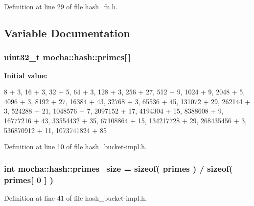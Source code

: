 Definition at line 29 of file hash\_\-fn.h.



\subsection{Variable Documentation}
\hypertarget{namespacemocha_1_1hash_a98b9570ac5f7d3eb6f5f82f9448048d4}{
\subsubsection[{primes}]{\setlength{\rightskip}{0pt plus 5cm}uint32\_\-t {\bf mocha::hash::primes}\mbox{[}$\,$\mbox{]}}}
\label{namespacemocha_1_1hash_a98b9570ac5f7d3eb6f5f82f9448048d4}
{\bfseries Initial value:}
\begin{DoxyCode}
 {
  8 + 3,
  16 + 3,
  32 + 5,
  64 + 3,
  128 + 3,
  256 + 27,
  512 + 9,
  1024 + 9,
  2048 + 5,
  4096 + 3,
  8192 + 27,
  16384 + 43,
  32768 + 3,
  65536 + 45,
  131072 + 29,
  262144 + 3,
  524288 + 21,
  1048576 + 7,
  2097152 + 17,
  4194304 + 15,
  8388608 + 9,
  16777216 + 43,
  33554432 + 35,
  67108864 + 15,
  134217728 + 29,
  268435456 + 3,
  536870912 + 11,
  1073741824 + 85
}
\end{DoxyCode}


Definition at line 10 of file hash\_\-bucket-\/impl.h.

\hypertarget{namespacemocha_1_1hash_a0dac030627349b25de202009e31652e6}{
\subsubsection[{primes\_\-size}]{\setlength{\rightskip}{0pt plus 5cm}int {\bf mocha::hash::primes\_\-size} = sizeof( {\bf primes} ) / sizeof( {\bf primes}\mbox{[} 0 \mbox{]} )}}
\label{namespacemocha_1_1hash_a0dac030627349b25de202009e31652e6}


Definition at line 41 of file hash\_\-bucket-\/impl.h.

